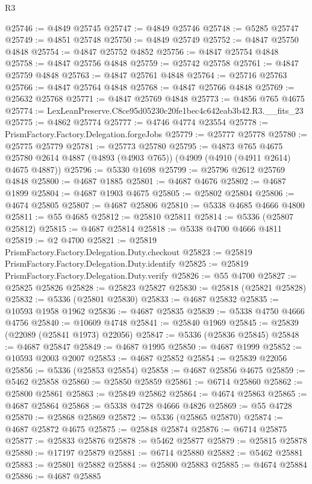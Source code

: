 \begin{lexlean}{R3}
\begin{coremodule}
@25746 := @4849 @25745
@25747 := @4849 @25746
@25748 := @5285 @25747
@25749 := @4851 @25748
@25750 := @4849 @25749
@25752 := @4847 @25750 @4848
@25754 := @4847 @25752 @4852
@25756 := @4847 @25754 @4848
@25758 := @4847 @25756 @4848
@25759 := @25742 @25758
@25761 := @4847 @25759 @4848
@25763 := @4847 @25761 @4848
@25764 := @25716 @25763
@25766 := @4847 @25764 @4848
@25768 := @4847 @25766 @4848
@25769 := @25632 @25768
@25771 := @4847 @25769 @4848
@25773 := @4856 @765 @4675
@25774 := LexLeanPreserve.C8ce95d05230c20fe1bec4c642eab3b42.R3.__fits_23
@25775 := @4862 @25774
@25777 := @4746 @4774 @23554
@25778 := PrismFactory.Factory.Delegation.forgeJobs
@25779 := @25777 @25778
@25780 := @25775 @25779
@25781 := @25773 @25780
@25795 := @4873
    @765
    @4675
    @25780
    @2614
    @4887
    (@4893 (@4903 @765))
    (@4909 (@4910 (@4911 @2614) @4675 @4887))
@25796 := @5330 @1698
@25799 := @25796 @2612 @25769 @4848
@25800 := @4687 @1885
@25801 := @4687 @4676
@25802 := @4687 @1899
@25804 := @4687 @1903 @4675
@25805 := @25802 @25804
@25806 := @4674 @25805
@25807 := @4687 @25806
@25810 := @5338 @4685 @4666 @4800
@25811 := @55 @4685
@25812 := @25810 @25811
@25814 := @5336 (@25807 @25812)
@25815 := @4687 @25814
@25818 := @5338 @4700 @4666 @4811
@25819 := @2 @4700
@25821 := @25819 PrismFactory.Factory.Delegation.Duty.checkout
@25823 := @25819 PrismFactory.Factory.Delegation.Duty.identify
@25825 := @25819 PrismFactory.Factory.Delegation.Duty.verify
@25826 := @55 @4700
@25827 := @25825 @25826
@25828 := @25823 @25827
@25830 := @25818 (@25821 @25828)
@25832 := @5336 (@25801 @25830)
@25833 := @4687 @25832
@25835 := @10593 @1958 @1962
@25836 := @4687 @25835
@25839 := @5338 @4750 @4666 @4756
@25840 := @10609 @4748
@25841 := @25840 @1969
@25845 := @25839 (@22089 (@25841 @1973) @22056)
@25847 := @5336 (@25836 @25845)
@25848 := @4687 @25847
@25849 := @4687 @1995
@25850 := @4687 @1999
@25852 := @10593 @2003 @2007
@25853 := @4687 @25852
@25854 := @25839 @22056
@25856 := @5336 (@25853 @25854)
@25858 := @4687 @25856 @4675
@25859 := @5462 @25858
@25860 := @25850 @25859
@25861 := @6714 @25860
@25862 := @25800 @25861
@25863 := @25849 @25862
@25864 := @4674 @25863
@25865 := @4687 @25864
@25868 := @5338 @4728 @4666 @4826
@25869 := @55 @4728
@25870 := @25868 @25869
@25872 := @5336 (@25865 @25870)
@25874 := @4687 @25872 @4675
@25875 := @25848 @25874
@25876 := @6714 @25875
@25877 := @25833 @25876
@25878 := @5462 @25877
@25879 := @25815 @25878
@25880 := @17197 @25879
@25881 := @6714 @25880
@25882 := @5462 @25881
@25883 := @25801 @25882
@25884 := @25800 @25883
@25885 := @4674 @25884
@25886 := @4687 @25885

\end{coremodule}
\end{lexlean}

